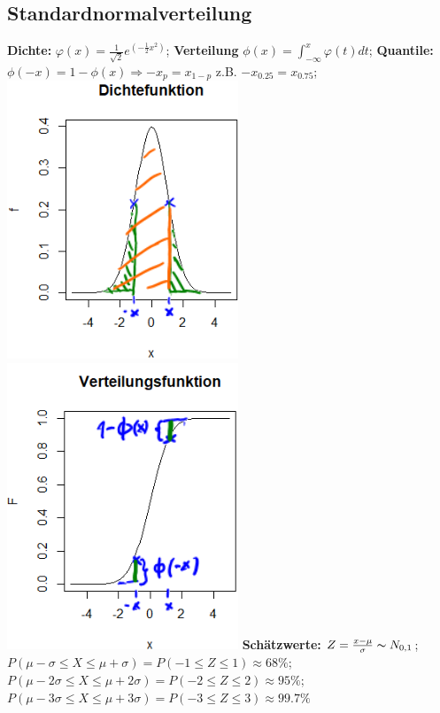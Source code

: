 \subsection{Standardnormalverteilung}
\textbf{Dichte:} 
$\varphi(x) = \frac{1}{\sqrt{2}}e^{(-\frac{1}{2}x^2)} $; 
\textbf{Verteilung}
$\phi(x) = \int_{-\infty}^{x} \varphi (t) dt$; 
\textbf{Quantile:} 
$ \phi (-x) = 1 - \phi (x) \Rightarrow -x_{p} = x_{1-p} $ z.B. 
$ -x_{0.25} = x_{0.75} $; 
\includegraphics[scale=0.3]{./pic/NormalverteilungDichtefunktion.png}
\includegraphics[scale=0.3]{./pic/NormalverteilungVerteilungsfunktion.png}
\textbf{Schätzwerte:}
$ Z = \frac{x-\mu}{\sigma} \thicksim N_ {0,1}$;\\
$ P( \mu -\sigma \le X \le \mu + \sigma) = P ( -1 \le Z \le 1 ) \approx 68\% $; \\
$ P ( \mu -2\sigma \le X \le \mu +2\sigma ) = P( -2 \le Z \le 2 ) \approx 95\% $; \\
$ P( \mu - 3 \sigma \le X \le \mu + 3\sigma) = P ( -3 \le Z \le 3 ) \approx 99.7\% $
